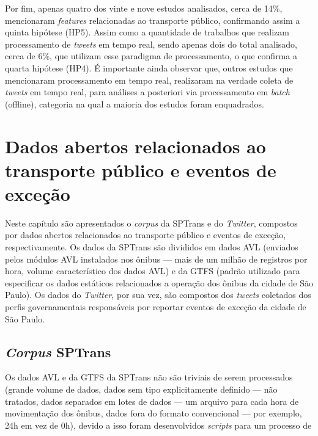 \documentclass[
	12pt,				%
	oneside,			%
	a4paper,			%
	english,			%
	brazil				%
	]{abntex2ppgsi}
\begin{document}
{{Por fim, apenas quatro dos vinte e nove estudos analisados, cerca de 14\%, mencionaram \textit{features} relacionadas ao transporte público, confirmando assim a quinta hipótese (HP5). Assim como a quantidade de trabalhos que realizam processamento de \textit{tweets} em tempo real, sendo apenas dois do total analisado, cerca de 6\%, que utilizam esse paradigma de processamento, o que confirma a quarta hipótese (HP4). É importante ainda observar que, outros estudos que mencionaram processamento em tempo real, realizaram na verdade coleta de \textit{tweets} em tempo real, para análises a posteriori via processamento em \textit{batch} (offline), categoria na qual a maioria dos estudos foram enquadrados.

\chapter{Dados abertos relacionados ao transporte público e eventos de exceção}
\label{dataSet}

Neste capítulo são apresentados o \textit{corpus} da SPTrans e do \textit{Twitter}, compostos por dados abertos relacionados ao transporte público e eventos de exceção, respectivamente. Os dados da SPTrans são divididos em dados AVL (enviados pelos módulos AVL instalados nos ônibus --- mais de um milhão de registros por hora, volume característico dos dados AVL) e da GTFS (padrão utilizado para especificar os dados estáticos relacionados a operação dos ônibus da cidade de São Paulo). Os dados do \textit{Twitter}, por sua vez, são compostos dos \textit{tweets} coletados dos perfis governamentais responsáveis por reportar eventos de exceção da cidade de São Paulo.

\section{\textit{Corpus} SPTrans}
\label{CorpusSPTrans}

Os dados AVL e da GTFS da SPTrans não são triviais de serem processados (grande volume de dados, dados sem tipo explicitamente definido --- não tratados, dados separados em lotes de dados --- um arquivo para cada hora de movimentação dos ônibus, dados fora do formato convencional --- por exemplo, 24h em vez de 0h), devido a isso foram desenvolvidos \textit{scripts} para um processo de  

}}
\end{document}
